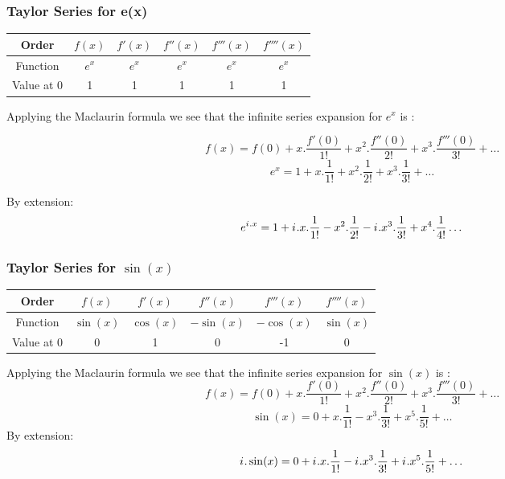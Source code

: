 \documentclass[10pt]{beamer}
\newcommand{\iu}{{i\mkern1mu}}
\begin{document}
\begin{frame}
	\frametitle{Taylor Series for e(x) }
	\begin{center}
		\begin{tabular}{|c|c|c|c|c|c|}
			\hline
			Order &$f(x)$ & $f'(x)$ & $f''(x)$ & $f'''(x)$ & $f''''(x)$ \\
			\hline
			Function & $e^x$  & $e^x$   & $e^x$    & $e^x$     & $e^x$      \\
			\hline
			Value at 0 & 1      & 1       & 1        & 1         & 1          \\
			\hline
		\end{tabular}
	\end{center}
	\vspace{20pt}
	Applying the Maclaurin formula we see that the infinite series expansion for $e^x$ is :

	{\large $$f(x) = f(0)+x.\dfrac{f'(0)}{1!}+ x^2.\dfrac{f''(0)}{2!} +x^3.\dfrac{f'''(0)}{3!} + \dots$$
	\large $$e^x = 1+x.\dfrac{1}{1!}+ x^2.\dfrac{1}{2!} +x^3.\dfrac{1}{3!} + \dots$$}

	By extension:
	{\large $$e^{{\iu}.x} = 1+\iu.x.\dfrac{1}{1!}- x^2.\dfrac{1}{2!} -\iu.x^3.\dfrac{1}{3!} + x^4.\dfrac{1}{4!} \dots$$}
\end{frame}

\begin{frame}
	\frametitle{Taylor Series for $\sin(x)$}
	\begin{center}
		\begin{tabular}{|c|c|c|c|c|c|}
			\hline
			Order & \(f(x)\)    & \(f'(x)\)   & \(f''(x)\)   & \(f'''(x)\)  & \(f''''(x)\) \\
			\hline
			Function & \(\sin(x)\) & \(\cos(x)\) & \(-\sin(x)\) & \(-\cos(x)\) & \(\sin(x)\)  \\
			\hline
			Value at 0 & 0           & 1           & 0            & -1           & 0            \\
			\hline
		\end{tabular}
	\end{center}
	\vspace{20pt}
	Applying the Maclaurin formula we see that the infinite series expansion for $\sin(x)$ is :
	{\large $$f(x) = f(0)+x.\dfrac{f'(0)}{1!}+ x^2.\dfrac{f''(0)}{2!} +x^3.\dfrac{f'''(0)}{3!} + \dots$$
	\large $$\sin(x) = 0+x.\dfrac{1}{1!} -x^3.\dfrac{1}{3!} + x^5.\dfrac{1}{5!} +\dots$$}	
	By extension: 
	{\large $$\iu.\sin(x) = 0+\iu.x.\dfrac{1}{1!} -\iu.x^3.\dfrac{1}{3!} + \iu.x^5.\dfrac{1}{5!} +\dots$$}

\end{frame}
\end{document}
